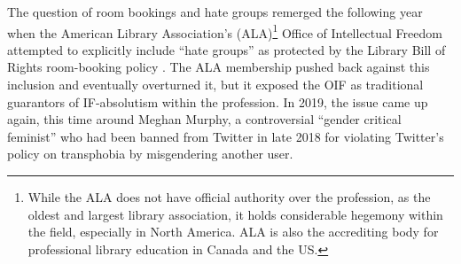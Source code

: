 \documentclass[12pt,oneside]{memoir}
\begin{document}
The question of room bookings and hate groups remerged the following year when the American Library Association's (ALA)\footnote{While the ALA does not have official authority over the profession, as the oldest and largest library association, it holds considerable hegemony within the field, especially in North America. ALA is also the accrediting body for professional library education in Canada and the US.} Office of Intellectual Freedom attempted to explicitly include ``hate groups'' as protected by the Library Bill of Rights room-booking policy \cite{yorio-peet-2018}. The ALA membership pushed back against this inclusion and eventually overturned it, but it exposed the OIF as traditional guarantors of IF-absolutism within the profession. In 2019, the issue came up again, this time around Meghan Murphy, a controversial ``gender critical feminist'' who had been banned from Twitter in late 2018 for violating Twitter's policy on transphobia by misgendering another user.

\backmatter

 

\end{document}

